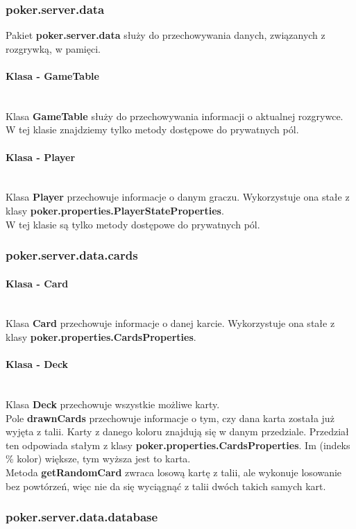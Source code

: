 \documentclass{article}
\newcommand{\mparagraph}[1]{\paragraph{#1}\mbox{}\vspace{2mm}\\}
\begin{document}
                
        \subsubsection{poker.server.data}
            Pakiet \textbf{poker.server.data} służy do przechowywania danych, związanych z rozgrywką, w pamięci.
        
            \mparagraph{Klasa - GameTable}
                Klasa \textbf{GameTable} służy do przechowywania informacji o aktualnej rozgrywce.
                \\
                W tej klasie znajdziemy tylko metody dostępowe do prywatnych pól.
                
            \mparagraph{Klasa - Player}
                Klasa \textbf{Player} przechowuje informacje o danym graczu.
                Wykorzystuje ona stałe z klasy \textbf{poker.properties.PlayerStateProperties}.
                \\
                W tej klasie są tylko metody dostępowe do prywatnych pól.
        
        \subsubsection{poker.server.data.cards}
        
            \mparagraph{Klasa - Card}
                Klasa \textbf{Card} przechowuje informacje o danej karcie.
                Wykorzystuje ona stałe z klasy \textbf{poker.properties.CardsProperties}.
        
            \mparagraph{Klasa - Deck}
                Klasa \textbf{Deck} przechowuje wszystkie możliwe karty.
                \\
                Pole \textbf{drawnCards} przechowuje informacje o tym, czy dana karta została już wyjęta z talii.
                Karty z danego koloru znajdują się w danym przedziale. Przedział ten odpowiada stałym z klasy \textbf{poker.properties.CardsProperties}. Im (indeks \% kolor) większe, tym wyższa jest to karta.
                \\
                Metoda \textbf{getRandomCard} zwraca losową kartę z talii, ale wykonuje losowanie bez powtórzeń, więc nie da się wyciągnąć z talii dwóch takich samych kart.
            
        
        \subsubsection{poker.server.data.database}
        
\end{document}
